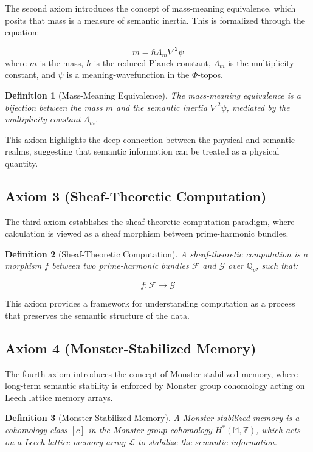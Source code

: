 \documentclass{article}
\theoremstyle{plain}
\newtheorem{definition}{Definition}
\begin{document}
The second axiom introduces the concept of mass-meaning equivalence, which posits that mass is a measure of semantic inertia. This is formalized through the equation:

$$
 m = \hbar \Lambda_m \nabla^2 \psi 
$$
where $m$ is the mass, $\hbar$ is the reduced Planck constant, $\Lambda_m$ is the multiplicity constant, and $\psi$ is a meaning-wavefunction in the $\Phi$-topos.

\begin{definition}[Mass-Meaning Equivalence]
The mass-meaning equivalence is a bijection between the mass $m$ and the semantic inertia $\nabla^2 \psi$, mediated by the multiplicity constant $\Lambda_m$.
\end{definition}

This axiom highlights the deep connection between the physical and semantic realms, suggesting that semantic information can be treated as a physical quantity.

\subsection{Axiom 3 (Sheaf-Theoretic Computation)}

The third axiom establishes the sheaf-theoretic computation paradigm, where calculation is viewed as a sheaf morphism between prime-harmonic bundles.

\begin{definition}[Sheaf-Theoretic Computation]
A sheaf-theoretic computation is a morphism $f$ between two prime-harmonic bundles $\mathcal{F}$ and $\mathcal{G}$ over $\mathbb{Q}_p$, such that:

$$
 f: \mathcal{F} \rightarrow \mathcal{G} 
$$
\end{definition}

This axiom provides a framework for understanding computation as a process that preserves the semantic structure of the data.

\subsection{Axiom 4 (Monster-Stabilized Memory)}

The fourth axiom introduces the concept of Monster-stabilized memory, where long-term semantic stability is enforced by Monster group cohomology acting on Leech lattice memory arrays.

\begin{definition}[Monster-Stabilized Memory]
A Monster-stabilized memory is a cohomology class $[c]$ in the Monster group cohomology $H^*(\mathbb{M}, \mathbb{Z})$, which acts on a Leech lattice memory array $\mathcal{L}$ to stabilize the semantic information.
\end{definition}
\end{document}
